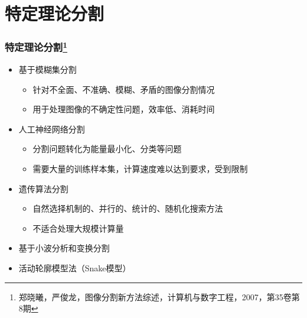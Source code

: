 \documentclass[notheorems,mathserif,table,compress]{beamer}  %
\begin{document}
\section{特定理论分割}
\begin{frame}
  \frametitle{特定理论分割\footnote{郑晓曦，严俊龙，图像分割新方法综述，计算机与数字工程，2007，第35卷第8期}}
  \begin{itemize}
  \item 基于模糊集分割
       \begin{itemize}
       \item 针对不全面、不准确、模糊、矛盾的图像分割情况
       \item 用于处理图像的不确定性问题，效率低、消耗时间
       \end{itemize}
  \item 人工神经网络分割
       \begin{itemize}
       \item 分割问题转化为能量最小化、分类等问题
       \item 需要大量的训练样本集，计算速度难以达到要求，受到限制
       \end{itemize}
  \item 遗传算法分割
       \begin{itemize}
       \item 自然选择机制的、并行的、统计的、随机化搜索方法
       \item 不适合处理大规模计算量
       \end{itemize}
  \item 基于小波分析和变换分割
  \item 活动轮廓模型法（Snake模型）
  \end{itemize}
\end{frame}
\end{document}
